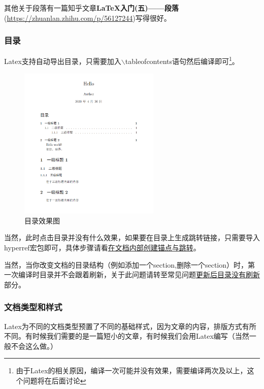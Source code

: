 \documentclass{article}
\begin{document}
                其他关于段落有一篇知乎文章\textbf{LaTeX入门(五)——段落}(\url{https://zhuanlan.zhihu.com/p/56127244})写得很好。

            \subsubsection{目录}
                Latex支持自动导出目录，只需要加入$\backslash$tableofcontents语句然后编译即可\footnote{由于Latex的相关原因，编译一次可能并没有效果，需要编译两次及以上，这个问题将在后面讨论}。

                

                \begin{figure}[H]
                    \centering
                    \includegraphics[width=0.6\textwidth]{snaps/snap3.png}
                    \caption{目录效果图}
                    \label{snap3}
                \end{figure}

                当然，此时点击目录并没有什么效果，如果要在目录上生成跳转链接，只需要导入hyperref宏包即可，具体步骤请看\hyperlink{author}{在文档内部创建锚点与跳转}。

                当然，当你改变文档的目录结构（例如添加一个section,删除一个section）时，第一次编译时目录并不会跟着刷新，关于此问题请转至常见问题\hyperlink{norefresh-toc}{更新后目录没有刷新}部分。

            \subsubsection{文档类型和样式}
                Latex为不同的文档类型预置了不同的基础样式，因为文章的内容，排版方式有所不同。有时候我们需要的是一篇短小的文章，有时候我们会用Latex编写（当然一般不会这么做。）
\end{document}
